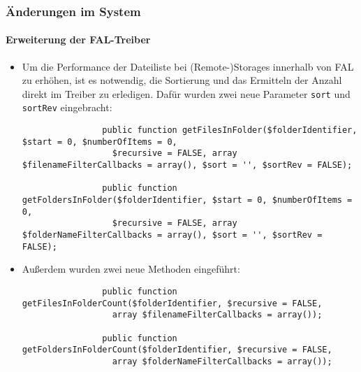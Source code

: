 \begin{frame}[fragile]
	\frametitle{Änderungen im System}
	\framesubtitle{Erweiterung der FAL-Treiber}

	\lstset{basicstyle=\tiny\ttfamily}

	\begin{itemize}
		\item Um die Performance der Dateiliste bei (Remote-)Storages innerhalb von FAL zu erhöhen,
			ist es notwendig, die Sortierung und das Ermitteln der Anzahl direkt im Treiber zu
			erledigen. Dafür wurden zwei neue Parameter \texttt{sort} und \texttt{sortRev} eingebracht:

			\begin{lstlisting}
				public function getFilesInFolder($folderIdentifier, $start = 0, $numberOfItems = 0,
				  $recursive = FALSE, array $filenameFilterCallbacks = array(), $sort = '', $sortRev = FALSE);

				public function getFoldersInFolder($folderIdentifier, $start = 0, $numberOfItems = 0,
				  $recursive = FALSE, array $folderNameFilterCallbacks = array(), $sort = '', $sortRev = FALSE);
			\end{lstlisting}

		\item Außerdem wurden zwei neue Methoden eingeführt:

			\begin{lstlisting}
				public function getFilesInFolderCount($folderIdentifier, $recursive = FALSE,
				  array $filenameFilterCallbacks = array());

				public function getFoldersInFolderCount($folderIdentifier, $recursive = FALSE,
				  array $folderNameFilterCallbacks = array());
			\end{lstlisting}

	\end{itemize}

\end{frame}

